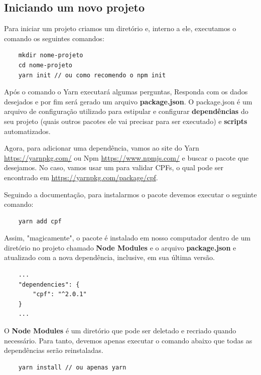 \subsection{Iniciando um novo projeto}

Para iniciar um projeto criamos um diretório e, interno a ele, executamos o comando os seguintes comandos: 

\begin{verbatim}
	mkdir nome-projeto 
	cd nome-projeto
	yarn init // ou como recomendo o npm init
\end{verbatim}

Após o comando o Yarn executará algumas perguntas, Responda com os dados desejados e por fim será gerado um arquivo \textbf{package.json}. O package.json é um arquivo de configuração utilizado para estipular e configurar \textbf{dependências} do seu projeto (quais outros pacotes ele vai precisar para ser executado) e \textbf{scripts} automatizados. 

Agora, para adicionar uma dependência, vamos ao site do Yarn \url{https://yarnpkg.com/} ou Npm \url{https://www.npmjs.com/} e buscar o pacote que desejamos. No caso, vamos usar um para validar CPFs, o qual pode ser encontrado em \url{https://yarnpkg.com/package/cpf}.

Seguindo a documentação, para instalarmos o pacote devemos executar o seguinte comando:

\begin{verbatim}
	yarn add cpf
\end{verbatim}

Assim, "magicamente", o pacote é instalado em nosso computador dentro de um diretório no projeto chamado \textbf{Node Modules} e o arquivo \textbf{package.json} e atualizado com a nova dependência, inclusive, em sua última versão. 

\begin{verbatim}
	...
	"dependencies": {
		"cpf": "^2.0.1"
	}
	...
\end{verbatim}

O \textbf{Node Modules} é um diretório que pode ser deletado e recriado quando necessário. Para tanto, devemos apenas executar o comando abaixo que todas as dependências serão reinstaladas. 

\begin{verbatim}
	yarn install // ou apenas yarn
\end{verbatim}

